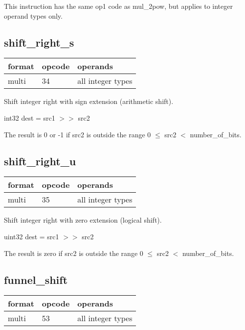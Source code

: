 \documentclass[forwardcom.tex]{subfiles}
\begin{document}
This instruction has the same op1 code as mul\_2pow, but applies to integer operand types only.
\vv


\subsection{shift\_right\_s}
\label{table:shiftRightSInstruction}
\begin{tabular}{|p{12mm}|p{15mm}|p{100mm}|}
\hline
\bfseries format & \bfseries opcode & \bfseries operands \\ \hline
multi & 34 & all integer types \\ \hline
\end{tabular}
\vv

Shift integer right with sign extension (arithmetic shift).
\vv

int32 dest = src1 $>>$ src2
\vv

The result is 0 or -1 if src2 is outside the range 0 $\leq$ src2 $<$ number\_of\_bits.

\vv


\subsection{shift\_right\_u}
\label{table:shiftRightUInstruction}
\begin{tabular}{|p{12mm}|p{15mm}|p{100mm}|}
\hline
\bfseries format & \bfseries opcode & \bfseries operands \\ \hline
multi & 35 & all integer types \\ \hline
\end{tabular}
\vv

Shift integer right with zero extension (logical shift).
\vv

uint32 dest = src1 $>>$ src2
\vv

The result is zero if src2 is outside the range 0 $\leq$ src2 $<$ number\_of\_bits.
\vv


\subsection{funnel\_shift}
\label{table:funnelShiftInstruction}
\begin{tabular}{|p{12mm}|p{15mm}|p{100mm}|}
\hline
\bfseries format & \bfseries opcode & \bfseries operands \\ \hline
multi & 53 & all integer types \\ \hline
\end{tabular}
\vv
\end{document}
